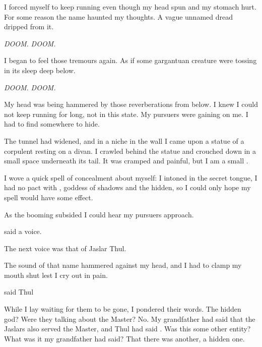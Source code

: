 \documentclass
  [a4paper,
   12pt,
   oneside
  ]%
  {article}
\begin{document}
I forced myself to keep running even though my head spun and my stomach hurt. 
For some reason the name \emph{\Ubloth} haunted my thoughts. 
A vague unnamed dread dripped from it.

\emph{DOOM.}
\emph{DOOM.}

I began to feel those tremours again.
As if some gargantuan creature were tossing in its sleep deep below.

\emph{DOOM.} 
\emph{DOOM.}

My head was being hammered by those reverberations from below. 
I knew I could not keep running for long, not in this state. 
My pursuers were gaining on me. 
I had to find somewhere to hide. 

The tunnel had widened, and in a niche in the wall I came upon a statue of a corpulent \scatha resting on a divan.%
\index{\scatha}
I crawled behind the statue and crouched down in a small space underneath its tail.
It was cramped and painful, but I am a small \scatha. 

I wove a quick spell of concealment about myself:
 I intoned in the secret \Draconic tongue, 
%
\index{\Nasshikerr}
I had no pact with \Nasshikerr, goddess of shadows and the hidden, so I could only hope my spell would have some effect. 

As the booming subsided I could hear my pursuers approach.

 said a voice.

The next voice was that of Jaslar Thul.

The sound of that name hammered against my head, and I had to clamp my mouth shut lest I cry out in pain.

 said Thul


While I lay waiting for them to be gone, I pondered their words.
The hidden god? 
Were they talking about the Master? 
No. 
My grandfather had said that the Jaslars also served the Master, and Thul had said .
Was this some other entity?
What was it my grandfather had said? 
That there was another, a hidden one.
\end{document}
